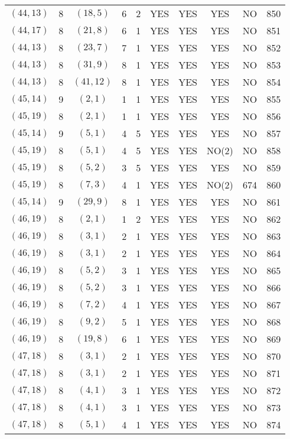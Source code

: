 \begin{longtable}{|c|c|c|c|c|c|c|c|c|c|}
$(44, 13)$ & 8 & $(18, 5)$ & 6 & 2 & YES & YES & YES & NO & 850\\
$(44, 17)$ & 8 & $(21, 8)$ & 6 & 1 & YES & YES & YES & NO & 851\\
$(44, 13)$ & 8 & $(23, 7)$ & 7 & 1 & YES & YES & YES & NO & 852\\
$(44, 13)$ & 8 & $(31, 9)$ & 8 & 1 & YES & YES & YES & NO & 853\\
$(44, 13)$ & 8 & $(41, 12)$ & 8 & 1 & YES & YES & YES & NO & 854\\
$(45, 14)$ & 9 & $(2, 1)$ & 1 & 1 & YES & YES & YES & NO & 855\\
$(45, 19)$ & 8 & $(2, 1)$ & 1 & 1 & YES & YES & YES & NO & 856\\
$(45, 14)$ & 9 & $(5, 1)$ & 4 & 5 & YES & YES & YES & NO & 857\\
$(45, 19)$ & 8 & $(5, 1)$ & 4 & 5 & YES & YES & NO(2) & NO & 858\\
$(45, 19)$ & 8 & $(5, 2)$ & 3 & 5 & YES & YES & YES & NO & 859\\
$(45, 19)$ & 8 & $(7, 3)$ & 4 & 1 & YES & YES & NO(2) & 674 & 860\\
$(45, 14)$ & 9 & $(29, 9)$ & 8 & 1 & YES & YES & YES & NO & 861\\
$(46, 19)$ & 8 & $(2, 1)$ & 1 & 2 & YES & YES & YES & NO & 862\\
$(46, 19)$ & 8 & $(3, 1)$ & 2 & 1 & YES & YES & YES & NO & 863\\
$(46, 19)$ & 8 & $(3, 1)$ & 2 & 1 & YES & YES & YES & NO & 864\\
$(46, 19)$ & 8 & $(5, 2)$ & 3 & 1 & YES & YES & YES & NO & 865\\
$(46, 19)$ & 8 & $(5, 2)$ & 3 & 1 & YES & YES & YES & NO & 866\\
$(46, 19)$ & 8 & $(7, 2)$ & 4 & 1 & YES & YES & YES & NO & 867\\
$(46, 19)$ & 8 & $(9, 2)$ & 5 & 1 & YES & YES & YES & NO & 868\\
$(46, 19)$ & 8 & $(19, 8)$ & 6 & 1 & YES & YES & YES & NO & 869\\
$(47, 18)$ & 8 & $(3, 1)$ & 2 & 1 & YES & YES & YES & NO & 870\\
$(47, 18)$ & 8 & $(3, 1)$ & 2 & 1 & YES & YES & YES & NO & 871\\
$(47, 18)$ & 8 & $(4, 1)$ & 3 & 1 & YES & YES & YES & NO & 872\\
$(47, 18)$ & 8 & $(4, 1)$ & 3 & 1 & YES & YES & YES & NO & 873\\
$(47, 18)$ & 8 & $(5, 1)$ & 4 & 1 & YES & YES & YES & NO & 874\\

\end{longtable}
